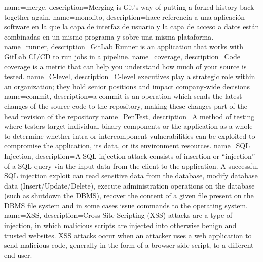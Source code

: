 {
        name=merge,
        description={Merging is Git's way of putting a forked history back together again.}
}
{
        name=monolito,
        description={hace referencia a una aplicación software en la que la capa
        de interfaz de usuario y la capa de acceso a datos están combinadas en
        un mismo programa y sobre una misma plataforma. }
}
{
        name=runner,
        description={GitLab Runner is an application that works with GitLab
        CI/CD to run jobs in a pipeline.}
}
{
        name=coverage,
        description={Code coverage is a metric that can help you understand how
        much of your source is tested.}
}
{
        name=C-level,
        description={C-level executives play a strategic role within an
        organization; they hold senior positions and impact company-wide
        decisions}
}
{
       name=commit,
       description={a commit is an operation which sends the latest changes of
       the source code to the repository, making these changes part of the head
       revision of the repository}
}
{
        name=PenTest,
        description={A method of testing where testers target individual binary
        components or the application as a whole to determine whether intra or
        intercomponent vulnerabilities can be exploited to compromise the
        application, its data, or its environment resources.}
}
{
        name=SQL Injection,
        description={A SQL injection attack consists of insertion or “injection”
        of a SQL query via the input data from the client to the application. A
        successful SQL injection exploit can read sensitive data from the
        database, modify database data (Insert/Update/Delete), execute
        administration operations on the database (such as shutdown the DBMS),
        recover the content of a given file present on the DBMS file system and
        in some cases issue commands to the operating system.}
}
{
        name=XSS,
        description={Cross-Site Scripting (XSS) attacks are a type of injection,
        in which malicious scripts are injected into otherwise benign and
        trusted websites. XSS attacks occur when an attacker uses a web
        application to send malicious code, generally in the form of a browser
        side script, to a different end user.}
}
